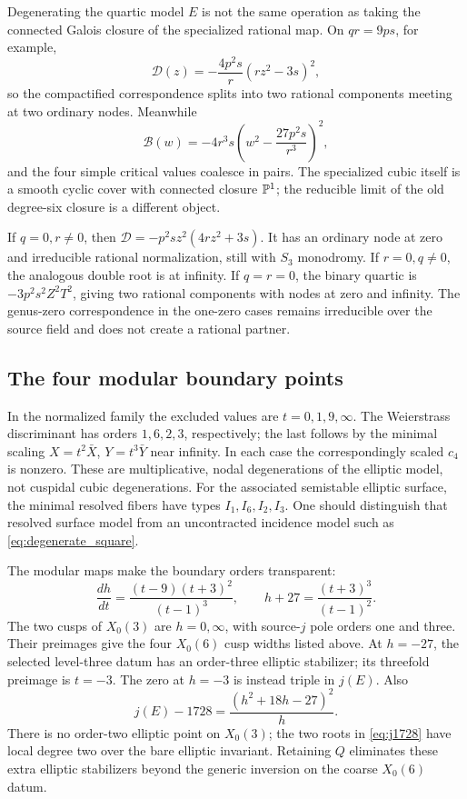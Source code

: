 Degenerating the quartic model \(E\) is not the same operation as taking the connected Galois closure of the specialized rational map. On \(qr=9ps\), for example,
\begin{equation}\label{eq:degenerate_square}
 \mathcal D(z)=-\frac{4p^2s}{r}(rz^2-3s)^2,
\end{equation}
so the compactified correspondence splits into two rational components meeting at two ordinary nodes. Meanwhile
\begin{equation}\label{eq:branch_square}
 \mathcal B(w)=-4r^3s\left(w^2-\frac{27p^2s}{r^3}\right)^2,
\end{equation}
and the four simple critical values coalesce in pairs. The specialized cubic itself is a smooth cyclic cover with connected closure \(\mathbb P^1\); the reducible limit of the old degree-six closure is a different object.

If \(q=0,r\ne0\), then
\(\mathcal D=-p^2s z^2(4rz^2+3s)\).
It has an ordinary node at zero and irreducible rational normalization, still with \(S_3\) monodromy. If \(r=0,q\ne0\), the analogous double root is at infinity. If \(q=r=0\), the binary quartic is \(-3p^2s^2Z^2T^2\), giving two rational components with nodes at zero and infinity. The genus-zero correspondence in the one-zero cases remains irreducible over the source field and does not create a rational partner.

\subsection{The four modular boundary points}
In the normalized family the excluded values are \(t=0,1,9,\infty\). The Weierstrass discriminant has orders \(1,6,2,3\), respectively; the last follows by the minimal scaling \(X=t^2\bar X\), \(Y=t^3\bar Y\) near infinity. In each case the correspondingly scaled \(c_4\) is nonzero. These are multiplicative, nodal degenerations of the elliptic model, not cuspidal cubic degenerations. For the associated semistable elliptic surface, the minimal resolved fibers have types \(I_1,I_6,I_2,I_3\). One should distinguish that resolved surface model from an uncontracted incidence model such as \eqref{eq:degenerate_square}.

The modular maps make the boundary orders transparent:
\begin{equation}\label{eq:h_ramification}
 \frac{dh}{dt}=\frac{(t-9)(t+3)^2}{(t-1)^3},\qquad
 h+27=\frac{(t+3)^3}{(t-1)^2}.
\end{equation}
The two cusps of \(X_0(3)\) are \(h=0,\infty\), with source-\(j\) pole orders one and three. Their preimages give the four \(X_0(6)\) cusp widths listed above. At \(h=-27\), the selected level-three datum has an order-three elliptic stabilizer; its threefold preimage is \(t=-3\). The zero at \(h=-3\) is instead triple in \(j(E)\). Also
\begin{equation}\label{eq:j1728}
 j(E)-1728=\frac{(h^2+18h-27)^2}{h}.
\end{equation}
There is no order-two elliptic point on \(X_0(3)\); the two roots in \eqref{eq:j1728} have local degree two over the bare elliptic invariant. Retaining \(Q\) eliminates these extra elliptic stabilizers beyond the generic inversion on the coarse \(X_0(6)\) datum.


